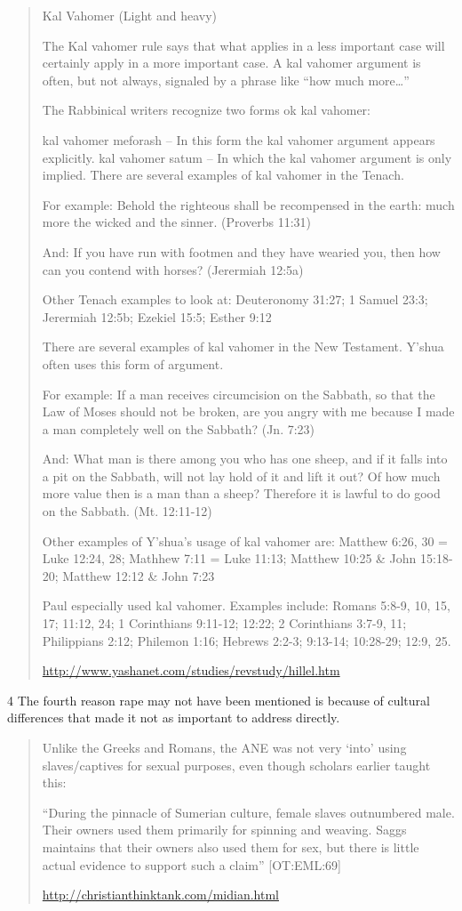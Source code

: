 \documentclass[11pt]{article}
\begin{document}
\begin{quote}
Kal Vahomer (Light and heavy)

The Kal vahomer rule says that what applies in a less important case will certainly apply in a more important case. A kal vahomer argument is often, but not always, signaled by a phrase like “how much more…”

The Rabbinical writers recognize two forms ok kal vahomer:

kal vahomer meforash – In this form the kal vahomer argument appears explicitly.
kal vahomer satum – In which the kal vahomer argument is only implied.
There are several examples of kal vahomer in the Tenach.

For example: Behold the righteous shall be recompensed in the earth: much more the wicked and the sinner. (Proverbs 11:31)

And: If you have run with footmen and they have wearied you, then how can you contend with horses? (Jerermiah 12:5a)

Other Tenach examples to look at: Deuteronomy 31:27; 1 Samuel 23:3; Jerermiah 12:5b; Ezekiel 15:5; Esther 9:12

There are several examples of kal vahomer in the New Testament. Y’shua often uses this form of argument.

For example: If a man receives circumcision on the Sabbath, so that the Law of Moses should not be broken, are you angry with me because I made a man completely well on the Sabbath? (Jn. 7:23)

And: What man is there among you who has one sheep, and if it falls into a pit on the Sabbath, will not lay hold of it and lift it out? Of how much more value then is a man than a sheep? Therefore it is lawful to do good on the Sabbath. (Mt. 12:11-12)

Other examples of Y'shua's usage of kal vahomer are:
Matthew 6:26, 30 = Luke 12:24, 28; Mathhew 7:11 = Luke 11:13; Matthew 10:25 \& John 15:18-20; Matthew 12:12 \& John 7:23

Paul especially used kal vahomer. Examples include: Romans 5:8-9, 10, 15, 17; 11:12, 24; 1 Corinthians 9:11-12; 12:22; 2 Corinthians 3:7-9, 11; Philippians 2:12; Philemon 1:16; Hebrews 2:2-3; 9:13-14; 10:28-29; 12:9, 25.

\url{http://www.yashanet.com/studies/revstudy/hillel.htm}
\end{quote}
4 The fourth reason rape may not have been mentioned is because of cultural differences that made it not as important to address directly.
\begin{quote}
Unlike the Greeks and Romans, the ANE was not very ‘into’ using slaves/captives for sexual purposes, even though scholars earlier taught this:

“During the pinnacle of Sumerian culture, female slaves outnumbered male. Their owners used them primarily for spinning and weaving. Saggs maintains that their owners also used them for sex, but there is little actual evidence to support such a claim” [OT:EML:69]

\url{http://christianthinktank.com/midian.html}
\end{quote}
\end{document}
